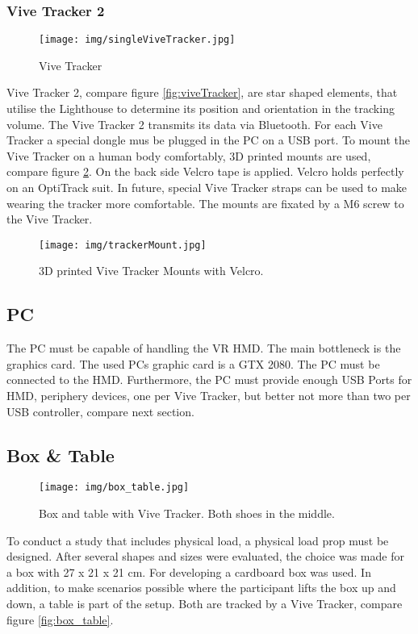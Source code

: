 \subsubsection{Vive Tracker 2}
\begin{figure}
	\centering
	\texttt{[image: img/singleViveTracker.jpg]}
	\caption{Vive Tracker}
	\label{fig:singleViveTracker}
\end{figure}
Vive Tracker 2, compare figure \ref{fig:viveTracker}, are star shaped elements, that utilise the Lighthouse to determine its position and orientation in the tracking volume. The Vive Tracker 2 transmits its data via Bluetooth. For each Vive Tracker a special dongle mus be plugged in the PC on a USB port. To mount the Vive Tracker on a human body comfortably, 3D printed mounts are used, compare figure \ref{fig:trackerMount}. On the back side Velcro tape is applied. Velcro holds perfectly on an OptiTrack suit. In future, special Vive Tracker straps can be used to make wearing the tracker more comfortable. The mounts are fixated by a M6 screw to the Vive Tracker.
\begin{figure}
	\centering
	\texttt{[image: img/trackerMount.jpg]}
	\caption{3D printed Vive Tracker Mounts with Velcro.}
	\label{fig:trackerMount}
\end{figure}

\subsection{PC}
The PC must be capable of handling the VR HMD. The main bottleneck is the graphics card. The used PCs graphic card is a GTX 2080. The PC must be connected to the HMD. Furthermore, the PC must provide enough USB Ports for HMD, periphery devices, one per Vive Tracker, but better not more than two per USB controller, compare next section.

\subsection{Box \& Table}
\begin{figure}
	\centering
	\texttt{[image: img/box\_table.jpg]}
	\caption{Box and table with Vive Tracker. Both shoes in the middle.}
\end{figure}

To conduct a study that includes physical load, a physical load prop must be designed. After several shapes and sizes were evaluated, the choice was made for a box with 27 x 21 x 21 cm. For developing a cardboard box was used. In addition, to make scenarios possible where the participant lifts the box up and down, a table is part of the setup. Both are tracked by a Vive Tracker, compare figure \ref{fig:box_table}.


